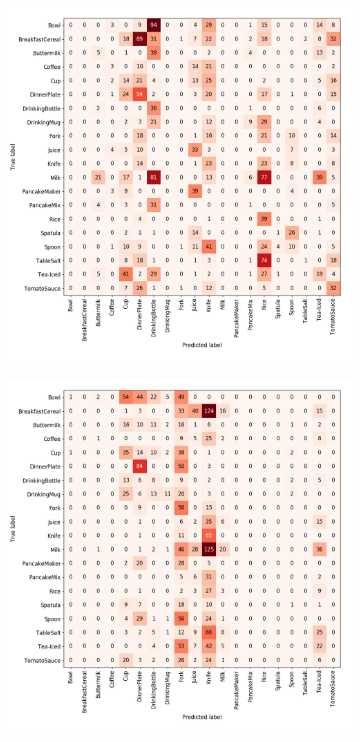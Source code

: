 \begin{figure}
\centering
	\begin{subfigure}[b]{0.48\textwidth}
		\includegraphics[scale=.27]{img/chapter6/UnrealGTClass_color.png}
	\end{subfigure}
	\begin{subfigure}[b]{0.48\textwidth}
		\includegraphics[scale=.27]{img/chapter6/UnrealGTClass_shape.png}	

\end{subfigure}
\end{figure}
